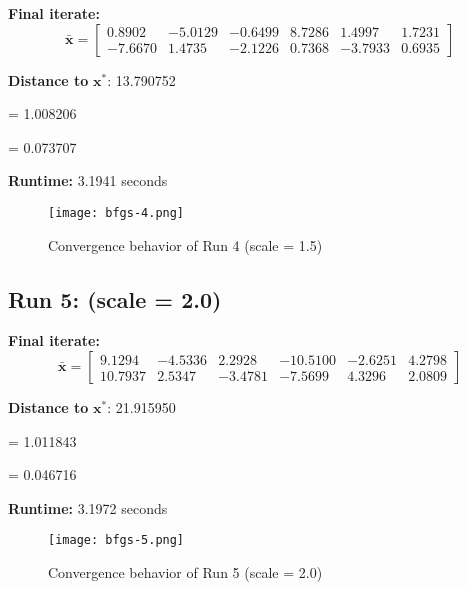 \documentclass{article}
\begin{document}
\textbf{Final iterate:}
\[
\bar{\mathbf{x}} =
\begin{bmatrix}
0.8902 & -5.0129 & -0.6499 & 8.7286 & 1.4997 & 1.7231 \\
-7.6670 & 1.4735 & -2.1226 & 0.7368 & -3.7933 & 0.6935
\end{bmatrix}
\]

\vspace{0.5em}
\noindent
\textbf{Distance to } $\mathbf{x}^*$: 13.790752

\vspace{0.5em}
\noindent
{} = 1.008206

\noindent
{} = 0.073707

\vspace{0.5em}
\noindent
\textbf{Runtime:} 3.1941 seconds

\begin{figure}[H]
    \centering
    \texttt{[image: bfgs-4.png]}
    \caption{Convergence behavior of Run 4 (scale = 1.5)}
    \label{fig:run4}
\end{figure}



\subsection*{Run 5: (scale = 2.0)}
\vspace{1em}

\textbf{Final iterate:}
\[
\bar{\mathbf{x}} =
\begin{bmatrix}
9.1294 & -4.5336 & 2.2928 & -10.5100 & -2.6251 & 4.2798 \\
10.7937 & 2.5347 & -3.4781 & -7.5699 & 4.3296 & 2.0809
\end{bmatrix}
\]

\vspace{0.5em}
\noindent
\textbf{Distance to } $\mathbf{x}^*$: 21.915950

\vspace{0.5em}
\noindent
{} = 1.011843

\noindent
{} = 0.046716

\vspace{0.5em}
\noindent
\textbf{Runtime:} 3.1972 seconds

\begin{figure}[H]
    \centering
    \texttt{[image: bfgs-5.png]}
    \caption{Convergence behavior of Run 5 (scale = 2.0)}
    \label{fig:run5}
\end{figure}
\end{document}
